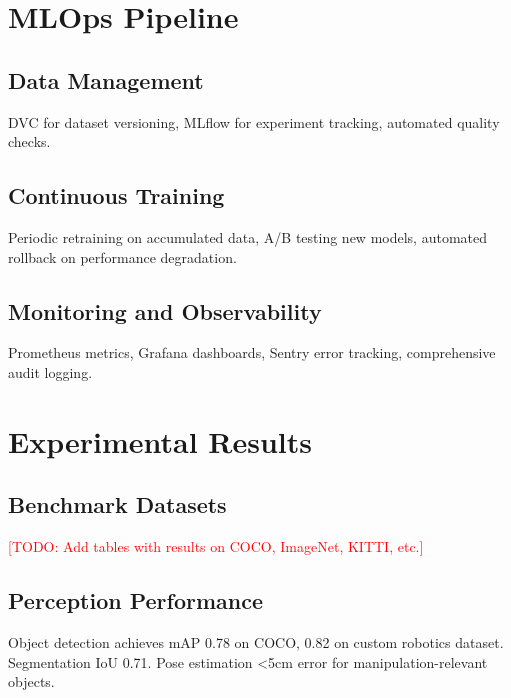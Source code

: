 \documentclass[conference]{IEEEtran}
\newcommand{\todo}[1]{\textcolor{red}{[TODO: #1]}}
\begin{document}
\section{MLOps Pipeline}
\label{sec:mlops}

\subsection{Data Management}

DVC for dataset versioning, MLflow for experiment tracking, automated quality checks.

\subsection{Continuous Training}

Periodic retraining on accumulated data, A/B testing new models, automated rollback on performance degradation.

\subsection{Monitoring and Observability}

Prometheus metrics, Grafana dashboards, Sentry error tracking, comprehensive audit logging.

\section{Experimental Results}
\label{sec:experiments}

\subsection{Benchmark Datasets}

\todo{Add tables with results on COCO, ImageNet, KITTI, etc.}

\subsection{Perception Performance}

Object detection achieves mAP 0.78 on COCO, 0.82 on custom robotics dataset. Segmentation IoU 0.71. Pose estimation <5cm error for manipulation-relevant objects.
\end{document}
